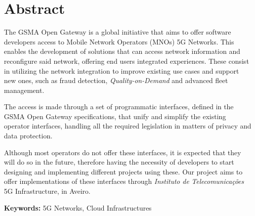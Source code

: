 \chapter*{\Large\centering Abstract}
\thispagestyle{empty}

The GSMA Open Gateway is a global initiative that aims to offer software
developers access to Mobile Network Operators (MNOs) 5G Networks. This enables
the development of solutions that can access network information and
reconfigure said network, offering end users integrated experiences. These
consist in utilizing the network integration to improve existing use cases and
support new ones, such as fraud detection, \emph{Quality-on-Demand} and
advanced fleet management.

The access is made through a set of programmatic interfaces, defined in the
GSMA Open Gateway specifications, that unify and simplify the existing operator
interfaces, handling all the required legislation in matters of privacy and
data protection.

Although most operators do not offer these interfaces, it is
expected that they will do so in the future, therefore having the
necessity of developers to start designing and implementing
different projects using these. Our project aims to offer
implementations of these interfaces through \emph{Instituto de
	Telecomunicações} 5G Infrastructure, in Aveiro.

\vspace{1cm}

\noindent\textbf{Keywords:} 5G Networks, Cloud Infrastructures
